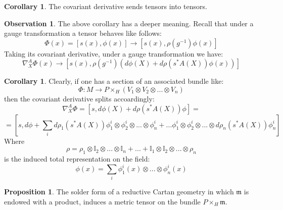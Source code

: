 \documentclass[12pt,a4paper]{report}
\theoremstyle{definition}
\theoremstyle{Theorem}
\newtheorem{Prop}[Def]{Proposition}
\theoremstyle{break}
\theoremstyle{definition}
\newtheorem{Cor}[Def]{Corollary}
\newtheorem{Obs}[Def]{Observation}
\begin{document}
	\begin{Cor}
		The covariant derivative sends tensors into tensors. 
	\end{Cor}
	\begin{Obs}
		The above corollary has a deeper meaning. Recall that under a gauge transformation a tensor behaves like follows:
		$$\Phi(x)=[s(x),\phi(x)]\longrightarrow[s(x),\rho(g^{-1})\phi(x)]$$
		Taking its covariant derivative, under a gauge transformation we have:
		$$\nabla_X^A\Phi(x)\longrightarrow[s(x),\rho(g^{-1})(d\phi(X)+d\rho(s^*A(X))\phi(x))]$$
	\end{Obs}
	\begin{Cor}
		Clearly, if one has a section of an associated bundle like:
		$$\Phi:M\rightarrow P\times_H(V_1\otimes V_2\otimes...\otimes V_n)$$
		then the covariant derivative splits accoardingly:
		$$\nabla^A_X \Phi=[s,d\phi(X)+d\rho(s^*A(X))\phi]=$$
		$$=[s,d\phi+\sum_i d\rho_1(s^*A(X))\phi^i_1\otimes \phi^i_2\otimes...\otimes \phi^i_n+...\phi^i_1\otimes \phi^i_2\otimes...\otimes d\rho_n(s^*A(X))\phi^i_n]$$
		Where
		$$\rho=\rho_1\otimes \mathbb{I}_2\otimes...\otimes\mathbb{I}_n+...+\mathbb{I}_1\otimes \mathbb{I}_2\otimes...\otimes\rho_n$$
		is the induced total representation on the field:
		$$\phi(x)=\sum_i \phi^i_1(x)\otimes...\otimes \phi^i_n(x)$$
	\end{Cor}
	\begin{Prop}
		The solder form of a reductive Cartan geometry in which $\mathfrak{m}$ is endowed with a product, induces a metric tensor on the bundle $P\times_H\mathfrak{m}$.
	\end{Prop}
\end{document}
